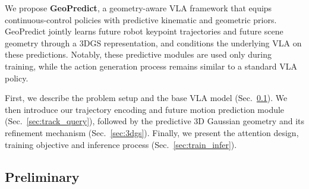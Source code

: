 
We propose \textbf{GeoPredict}, a geometry-aware VLA framework that equips continuous-control policies with predictive kinematic and geometric priors. GeoPredict jointly learns future robot keypoint trajectories and future scene geometry through a 3DGS representation, and conditions the underlying VLA on these predictions. Notably, these predictive modules are used only during training, while the action generation process remains similar to a standard VLA policy.

First, we describe the problem setup and the base VLA model (Sec.~\ref{sec:preliminary}). We then introduce our trajectory encoding and future motion prediction module (Sec.~\ref{sec:track_query}), followed by the predictive 3D Gaussian geometry and its refinement mechanism (Sec.~\ref{sec:3dgs}). Finally, we present the attention design, training objective and inference process (Sec.~\ref{sec:train_infer}).


\subsection{Preliminary} \label{sec:preliminary}

